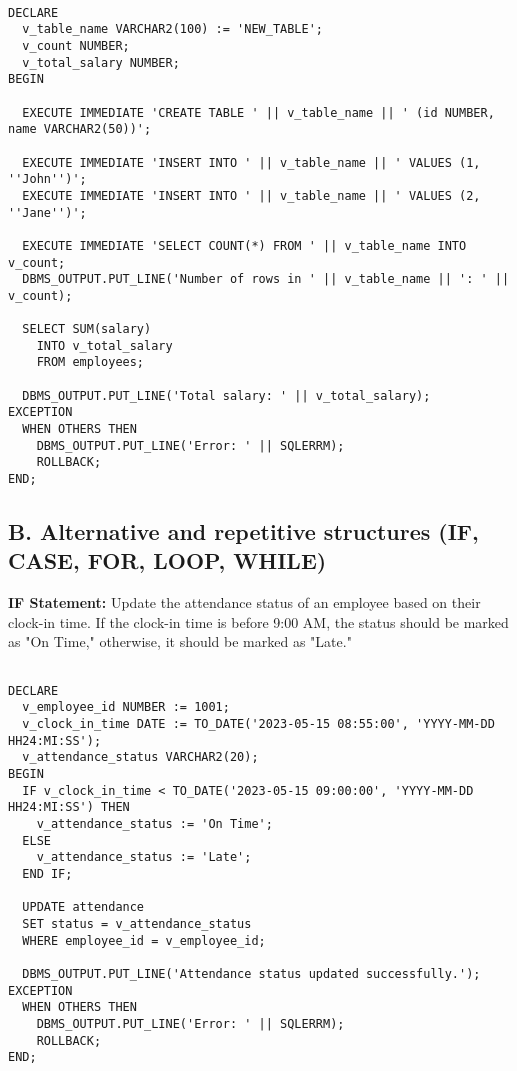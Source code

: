 \documentclass[11pt]{article} %
\begin{document}
\begin{small}
\begin{verbatim}

DECLARE
  v_table_name VARCHAR2(100) := 'NEW_TABLE';
  v_count NUMBER;
  v_total_salary NUMBER;
BEGIN

  EXECUTE IMMEDIATE 'CREATE TABLE ' || v_table_name || ' (id NUMBER, name VARCHAR2(50))';

  EXECUTE IMMEDIATE 'INSERT INTO ' || v_table_name || ' VALUES (1, ''John'')';
  EXECUTE IMMEDIATE 'INSERT INTO ' || v_table_name || ' VALUES (2, ''Jane'')';

  EXECUTE IMMEDIATE 'SELECT COUNT(*) FROM ' || v_table_name INTO v_count;
  DBMS_OUTPUT.PUT_LINE('Number of rows in ' || v_table_name || ': ' || v_count);

  SELECT SUM(salary)
    INTO v_total_salary
    FROM employees;

  DBMS_OUTPUT.PUT_LINE('Total salary: ' || v_total_salary);
EXCEPTION
  WHEN OTHERS THEN
    DBMS_OUTPUT.PUT_LINE('Error: ' || SQLERRM);
    ROLLBACK;
END;

\end{verbatim}
\end{small}

\pagebreak

\subsection*{B. Alternative and repetitive structures (IF, CASE, FOR, LOOP, WHILE)}

\textbf{IF Statement:} Update the attendance status of an employee based on their clock-in time. If the clock-in time is before 9:00 AM, the status should be marked as "On Time," otherwise, it should be marked as "Late."

\begin{small}
\begin{verbatim}

DECLARE
  v_employee_id NUMBER := 1001;
  v_clock_in_time DATE := TO_DATE('2023-05-15 08:55:00', 'YYYY-MM-DD HH24:MI:SS');
  v_attendance_status VARCHAR2(20);
BEGIN
  IF v_clock_in_time < TO_DATE('2023-05-15 09:00:00', 'YYYY-MM-DD HH24:MI:SS') THEN
    v_attendance_status := 'On Time';
  ELSE
    v_attendance_status := 'Late';
  END IF;

  UPDATE attendance
  SET status = v_attendance_status
  WHERE employee_id = v_employee_id;

  DBMS_OUTPUT.PUT_LINE('Attendance status updated successfully.');
EXCEPTION
  WHEN OTHERS THEN
    DBMS_OUTPUT.PUT_LINE('Error: ' || SQLERRM);
    ROLLBACK;
END;

\end{verbatim}
\end{small}
\end{document}
